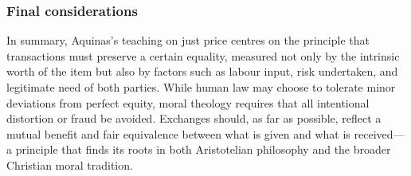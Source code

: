         \subsubsection{Final considerations}

    \noindent In summary, Aquinas’s teaching on just price centres on the principle that transactions must preserve a certain equality, measured not only by the intrinsic worth of the item but also by factors such as labour input, risk undertaken, and legitimate need of both parties. While human law may choose to tolerate minor deviations from perfect equity, moral theology requires that all intentional distortion or fraud be avoided. Exchanges should, as far as possible, reflect a mutual benefit and fair equivalence between what is given and what is received—a principle that finds its roots in both Aristotelian philosophy and the broader Christian moral tradition.
